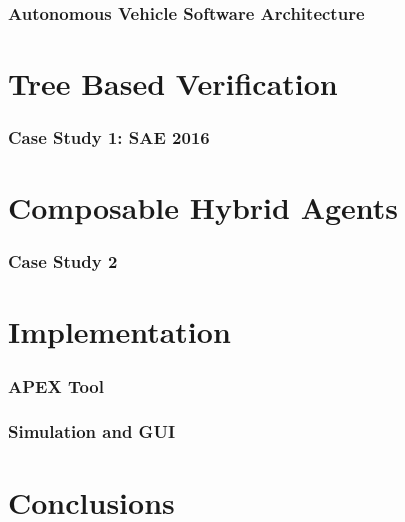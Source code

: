 \documentclass[11pt]{article}              %
\begin{document}
\section{Autonomous Vehicle Software Architecture}



\pagebreak
\part{Tree Based Verification}
\section{Case Study 1: SAE 2016}

\pagebreak
\part{Composable Hybrid Agents}
\section{Case Study 2}

\pagebreak

\part{Implementation}
\section{APEX Tool}


\section{Simulation and GUI}

\pagebreak
\part{Conclusions}


\pagebreak


 
\end{document}
